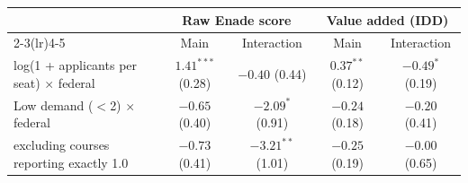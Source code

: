 \begin{tabular}{lcccc}
\toprule
 & \multicolumn{2}{c}{Raw Enade score} & \multicolumn{2}{c}{Value added (IDD)} \\
\cmidrule(lr){2-3}\cmidrule(lr){4-5}
 & Main & Interaction & Main & Interaction \\
\midrule
log(1 + applicants per seat) $\times$ federal & $1.41^{***}$ (0.28) & $-0.40$ (0.44) & $0.37^{**}$ (0.12) & $-0.49^{*}$ (0.19) \\
Low demand ($<$2) $\times$ federal & $-0.65$ (0.40) & $-2.09^{*}$ (0.91) & $-0.24$ (0.18) & $-0.20$ (0.41) \\
\quad excluding courses reporting exactly 1.0 & $-0.73$ (0.41) & $-3.21^{**}$ (1.01) & $-0.25$ (0.19) & $-0.00$ (0.65) \\
\bottomrule
\end{tabular}